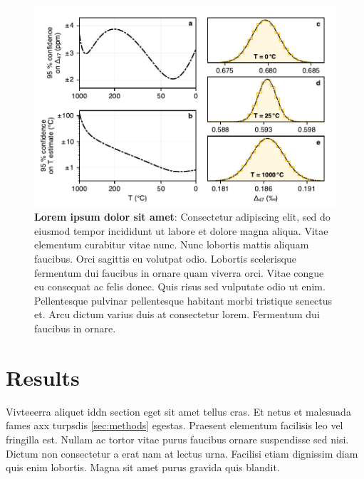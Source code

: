\begin{figure}[tb]
\begin{minipage}{0.49999999999999994\textwidth}
\includegraphics[width=\textwidth]{input/qmc}
\end{minipage}
\hfill
\begin{minipage}{0.45\textwidth}
\caption{
\textbf{Lorem ipsum dolor sit amet}: Consectetur adipiscing elit, sed do
eiusmod tempor incididunt ut labore et dolore magna aliqua. Vitae
elementum curabitur vitae nunc. Nunc lobortis mattis aliquam faucibus.
Orci sagittis eu volutpat odio. Lobortis scelerisque fermentum dui
faucibus in ornare quam viverra orci. Vitae congue eu consequat ac felis
donec. Quis risus sed vulputate odio ut enim. Pellentesque pulvinar
pellentesque habitant morbi tristique senectus et. Arcu dictum varius
duis at consectetur lorem. Fermentum dui faucibus in ornare.
}
\label{fig:qmc}
\end{minipage}
\end{figure}

\hypertarget{results}{%
\section{Results}\label{results}}

Vivteeerra aliquet iddn section eget sit amet tellus cras. Et netus et
malesuada fames axx turpsdis \ref{sec:methods} egestas. Praesent
elementum facilisis leo vel fringilla est. Nullam ac tortor vitae purus
faucibus ornare suspendisse sed nisi. Dictum non consectetur a erat nam
at lectus urna. Facilisi etiam dignissim diam quis enim lobortis. Magna
sit amet purus gravida quis blandit.

